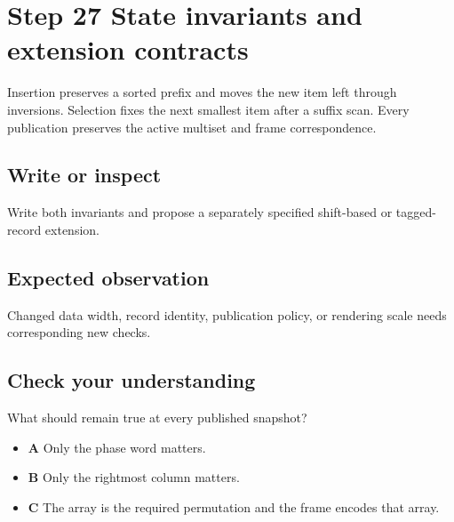 \section{Step 27 State invariants and extension
  contracts}\label{009-sorting-visualizer-s27-step-27-state-invariants-and-extension-contracts}

Insertion preserves a sorted prefix and moves the new item left through
inversions. Selection fixes the next smallest item after a suffix scan.
Every publication preserves the active multiset and frame
correspondence.

\subsection{Write or
  inspect}\label{009-sorting-visualizer-s27-write-or-inspect}

Write both invariants and propose a separately specified shift-based or
tagged-record extension.

\subsection{Expected
  observation}\label{009-sorting-visualizer-s27-expected-observation}

Changed data width, record identity, publication policy, or rendering
scale needs corresponding new checks.

\subsection{Check your
  understanding}\label{009-sorting-visualizer-s27-check-your-understanding}

What should remain true at every published snapshot?

\begin{itemize}
  \tightlist
  \item
        \textbf{A} Only the phase word matters.
  \item
        \textbf{B} Only the rightmost column matters.
  \item
        \textbf{C} The array is the required permutation and the frame encodes
        that array.
\end{itemize}
